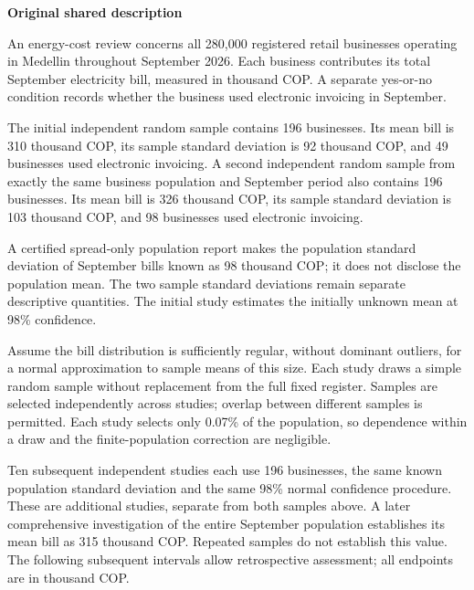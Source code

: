 \secInicio

\clearpage


\textbf{Original shared description}

An energy-cost review concerns all 280,000 registered retail businesses operating in Medellin throughout September 2026. Each business contributes its total September electricity bill, measured in thousand COP. A separate yes-or-no condition records whether the business used electronic invoicing in September.

The initial independent random sample contains 196 businesses. Its mean bill is 310 thousand COP, its sample standard deviation is 92 thousand COP, and 49 businesses used electronic invoicing. A second independent random sample from exactly the same business population and September period also contains 196 businesses. Its mean bill is 326 thousand COP, its sample standard deviation is 103 thousand COP, and 98 businesses used electronic invoicing.

A certified spread-only population report makes the population standard deviation of September bills known as 98 thousand COP; it does not disclose the population mean. The two sample standard deviations remain separate descriptive quantities. The initial study estimates the initially unknown mean at 98\% confidence.

Assume the bill distribution is sufficiently regular, without dominant outliers, for a normal approximation to sample means of this size. Each study draws a simple random sample without replacement from the full fixed register. Samples are selected independently across studies; overlap between different samples is permitted. Each study selects only 0.07\% of the population, so dependence within a draw and the finite-population correction are negligible.

Ten subsequent independent studies each use 196 businesses, the same known population standard deviation and the same 98\% normal confidence procedure. These are additional studies, separate from both samples above. A later comprehensive investigation of the entire September population establishes its mean bill as 315 thousand COP. Repeated samples do not establish this value. The following subsequent intervals allow retrospective assessment; all endpoints are in thousand COP.

